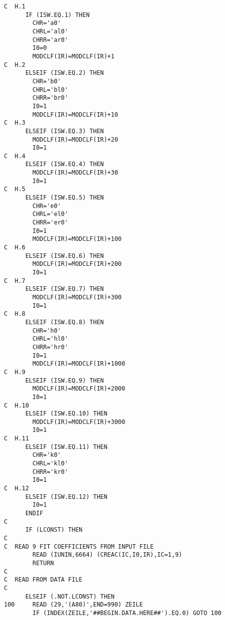\documentclass[12pt]{article}
\begin{document}
\begin{small}
\begin{verbatim}
C  H.1
      IF (ISW.EQ.1) THEN
        CHR='a0'
        CHRL='al0'
        CHRR='ar0'
        I0=0
        MODCLF(IR)=MODCLF(IR)+1
C  H.2
      ELSEIF (ISW.EQ.2) THEN
        CHR='b0'
        CHRL='bl0'
        CHRR='br0'
        I0=1
        MODCLF(IR)=MODCLF(IR)+10
C  H.3
      ELSEIF (ISW.EQ.3) THEN
        MODCLF(IR)=MODCLF(IR)+20
        I0=1
C  H.4
      ELSEIF (ISW.EQ.4) THEN
        MODCLF(IR)=MODCLF(IR)+30
        I0=1
C  H.5
      ELSEIF (ISW.EQ.5) THEN
        CHR='e0'
        CHRL='el0'
        CHRR='er0'
        I0=1
        MODCLF(IR)=MODCLF(IR)+100
C  H.6
      ELSEIF (ISW.EQ.6) THEN
        MODCLF(IR)=MODCLF(IR)+200
        I0=1
C  H.7
      ELSEIF (ISW.EQ.7) THEN
        MODCLF(IR)=MODCLF(IR)+300
        I0=1
C  H.8
      ELSEIF (ISW.EQ.8) THEN
        CHR='h0'
        CHRL='hl0'
        CHRR='hr0'
        I0=1
        MODCLF(IR)=MODCLF(IR)+1000
C  H.9
      ELSEIF (ISW.EQ.9) THEN
        MODCLF(IR)=MODCLF(IR)+2000
        I0=1
C  H.10
      ELSEIF (ISW.EQ.10) THEN
        MODCLF(IR)=MODCLF(IR)+3000
        I0=1
C  H.11
      ELSEIF (ISW.EQ.11) THEN
        CHR='k0'
        CHRL='kl0'
        CHRR='kr0'
        I0=1
C  H.12
      ELSEIF (ISW.EQ.12) THEN
        I0=1
      ENDIF
C
      IF (LCONST) THEN
C
C  READ 9 FIT COEFFICIENTS FROM INPUT FILE
        READ (IUNIN,6664) (CREAC(IC,I0,IR),IC=1,9)
        RETURN
C
C  READ FROM DATA FILE
C
      ELSEIF (.NOT.LCONST) THEN
100     READ (29,'(A80)',END=990) ZEILE
        IF (INDEX(ZEILE,'##BEGIN.DATA.HERE##').EQ.0) GOTO 100


\end{verbatim}
\end{small}
\end{document}
